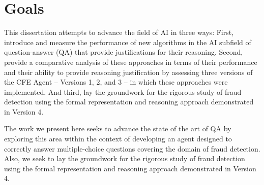 \section{Goals}

This dissertation attempts to advance the field of AI in three ways:  First, introduce and measure the performance of new algorithms in the AI subfield of question-answer (QA) that provide justifications for their reasoning.  Second,  provide a comparative analysis of these approaches in terms of their performance and their ability to provide reasoning justification by assessing three versions of the CFE Agent -- Versions 1, 2, and 3 -- in which these approaches were implemented.  And third, lay the groundwork for the rigorous study of fraud detection using the formal representation and reasoning approach demonstrated in Version 4.  

The work we present here seeks to advance the state of the art of QA by exploring this area within the context of developing an agent designed to correctly answer multiple-choice questions covering the domain of fraud detection.   Also, we seek to lay the groundwork for the rigorous study of fraud detection using the formal representation and reasoning approach demonstrated in Version 4.  


